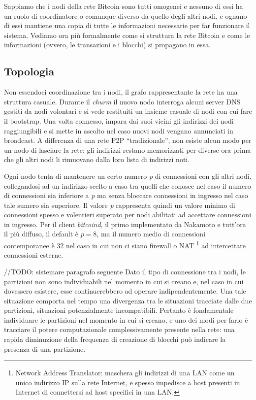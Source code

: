 Sappiamo che i nodi della rete Bitcoin sono tutti omogenei e nessuno di
essi ha un ruolo di coordinatore o comunque diverso da quello degli
altri nodi, e ognuno di essi mantiene una copia di tutte le informazioni
necessarie per far funzionare il sistema. Vediamo ora più formalmente
come si struttura la rete Bitcoin e come le informazioni (ovvero, le
transazioni e i blocchi) si propagano in essa.

\subsection{Topologia}\label{topologia}

Non essendoci coordinazione tra i nodi, il grafo rappresentante la rete
ha una struttura casuale. Durante il \emph{churm} il nuovo nodo
interroga alcuni server DNS gestiti da nodi volontari e si vede
restituiti un insieme casuale di nodi con cui fare il bootstrap. Una
volta connesso, impara dai suoi vicini gli indirizzi dei nodi
raggiungibili e si mette in ascolto nel caso nuovi nodi vengano
annunciati in broadcast. A differenza di una rete P2P ``tradizionale'',
non esiste alcun modo per un nodo di lasciare la rete: gli indirizzi
restano memorizzati per diverse ora prima che gli altri nodi li
rimuovano dalla loro lista di indirizzi noti.

Ogni nodo tenta di mantenere un certo numero \emph{p} di connessioni con
gli altri nodi, collegandosi ad un indirizzo scelto a caso tra quelli
che conosce nel caso il numero di connessioni sia inferiore a \emph{p}
ma senza bloccare connessioni in ingresso nel caso tale sumero sia
superiore. Il valore \emph{p} rappresenta quindi un valore minimo di
connessioni spesso e volentieri superato per nodi abilitati ad accettare
connessioni in ingresso. Per il client \emph{bitcoind}, il primo
implementato da Nakamoto e tutt'ora il più diffuso, il default è $p=8$,
ma il numero medio di connessioni contemporanee è 32 nel caso in cui non
ci siano firewall o NAT \footnote{Network Address Translator: maschera
  gli indirizzi di una LAN come un unico indirizzo IP sulla rete
  Internet, e spesso impedisce a host presenti in Internet di
  connettersi ad host specifici in una LAN.} ad intercettare connessioni
esterne.

//TODO: sistemare paragrafo seguente Dato il tipo di connessione tra i
nodi, le partizioni non sono individuabili nel momento in cui si creano
e, nel caso in cui dovessero esistere, esse continuerebbero ad operare
indipendentemente. Una tale situazione comporta nel tempo una divergenza
tra le situazioni tracciate dalle due partizioni, situazioni
potenzialmente incompatibili. Pertanto è fondamentale individuare le
partizioni nel momento in cui si creano, e uno dei modi per farlo è
tracciare il potere computazionale complessivamente presente nella rete:
una rapida diminuzione della frequenza di creazione di blocchi può
indicare la presenza di una partizione.

